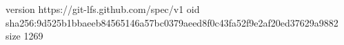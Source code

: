 version https://git-lfs.github.com/spec/v1
oid sha256:9d525b1bbaeeb84565146a57bc0379aeed8f0c43fa52f9e2af20ed37629a9882
size 1269
